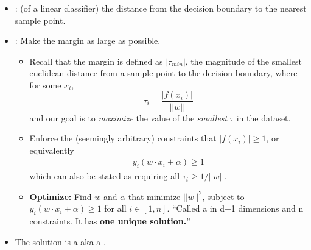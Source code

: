 \documentclass[12pt]{article}
\begin{document}
\subsubsection{}
\begin{itemize}
	\item {}: (of a linear classifier) the distance from the decision boundary to the nearest sample point.
	\item {}: Make the margin as large as possible.
	\begin{itemize}
		\item Recall that the margin is defined as $|\tau_{min}|$, the magnitude of the smallest euclidean distance from a sample point to the decision boundary, where for some $x_i$,
		\[ \tau_i = \frac{|f(x_i)|}{||w||} \]
		and our goal is to \emph{maximize} the value of the \emph{smallest} $\tau$ in the dataset.
		\item Enforce the (seemingly arbitrary) constraints that $|f(x_i)| \ge 1$, or equivalently
		\begin{align}
		y_i (w \cdot x_i + \alpha) \ge 1
		\end{align}
		which can also be stated as requiring all $\tau_i \ge 1/||w||$.
		\item \textbf{Optimize:} Find $w$ and $\alpha$ that minimize $||w||^2$, subject to $y_i (w \cdot x_i + \alpha) \ge 1$ for all $i \in [1, n]$. ``Called a  in d+1 dimensions and n constraints. It has \textbf{one unique solution.}''
	\end{itemize}
	\item The solution is a  aka a .
\end{itemize}

\end{document}
